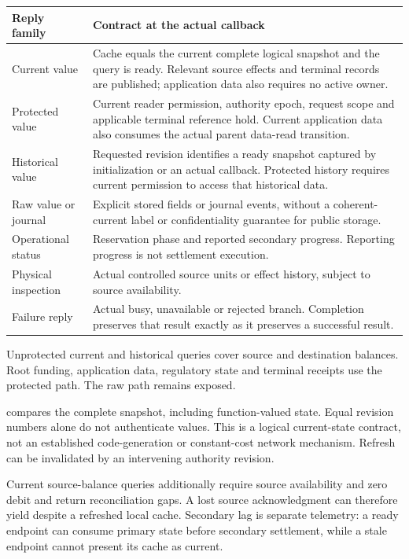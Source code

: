 \documentclass[10pt,a4paper]{article}
\newcommand{\code}[1]{\texttt{\detokenize{#1}}}
\begin{document}
{\small
\begin{tabularx}{\textwidth}{@{}L{0.24\textwidth}Y@{}}
\toprule
Reply family & Contract at the actual callback \\
\midrule
Current value & Cache equals the current complete logical snapshot and the
  query is ready. Relevant source effects and terminal records are published;
  application data also requires no active owner. \\
Protected value & Current reader permission, authority epoch, request scope
  and applicable terminal reference hold. Current application data also
  consumes the actual parent data-read transition. \\
Historical value & Requested revision identifies a ready snapshot captured
  by initialization or an actual callback. Protected history requires current
  permission to access that historical data. \\
Raw value or journal & Explicit stored fields or journal events, without
  a coherent-current label or confidentiality guarantee for public storage. \\
Operational status & Reservation phase and reported secondary progress.
  Reporting progress is not settlement execution. \\
Physical inspection & Actual controlled source units or effect history,
  subject to source availability. \\
Failure reply & Actual busy, unavailable or rejected branch. Completion
  preserves that result exactly as it preserves a successful result. \\
\bottomrule
\end{tabularx}}

Unprotected current and historical queries cover source and destination
balances. Root funding, application data, regulatory state and terminal
receipts use the protected path. The raw path remains exposed.

\code{current_cache_valid} compares the complete snapshot, including
function-valued state. Equal revision numbers alone do not authenticate values.
This is a logical current-state contract, not an established code-generation
or constant-cost network mechanism. Refresh can be invalidated by an intervening
authority revision.

Current source-balance queries additionally require source availability and
zero debit and return reconciliation gaps. A lost source acknowledgment can
therefore yield \code{Busy} despite a refreshed local cache. Secondary lag is
separate telemetry: a ready endpoint can consume primary state before secondary
settlement, while a stale endpoint cannot present its cache as current.
\end{document}
